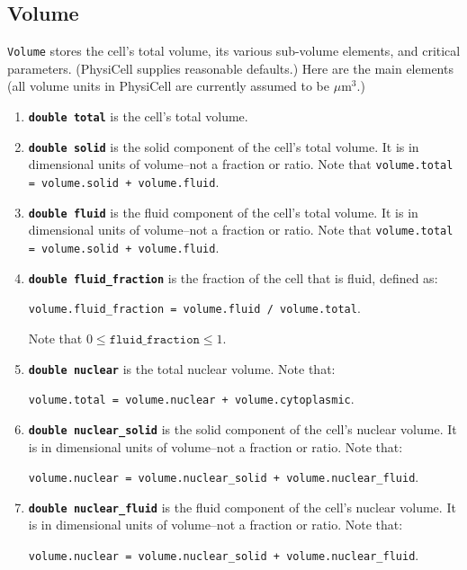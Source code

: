 \documentclass[12pt]{article}
\newcommand{\micron}{\mu\textrm{m}}
\renewcommand{\v}{\verb}
\newcommand{\smallcode}[1]{\textbf{\texttt{#1}}}
\newcommand{\blue}[1]{\textcolor{blue}{#1}}
\newcommand{\DONE}{}%
\begin{document}
\subsection{Volume \DONE}
\label{sec:Volume}
\v|Volume| stores the cell's total volume, its various sub-volume elements, and critical 
parameters. %
(PhysiCell supplies reasonable defaults.) Here are the main elements (all volume units 
in PhysiCell are currently assumed to be $\micron^3$.)  
\begin{enumerate}
\item 
\smallcode{double total} is the cell's total volume. 

\item 
\smallcode{double solid} is the solid component of the cell's total volume. It is in dimensional units 
of volume--not a fraction or ratio. Note that \v|volume.total = volume.solid + volume.fluid|.

\item 
\smallcode{double fluid} is the fluid component of the cell's total volume. It is in dimensional units 
of volume--not a fraction or ratio. Note that \v|volume.total = volume.solid + volume.fluid|.

\item 
\smallcode{double fluid\_fraction} is the fraction of the cell that is fluid, defined as:
 
\verb|volume.fluid_fraction = volume.fluid / volume.total|.  

Note that $0 \le \texttt{fluid\_fraction} \le 1.$

\item 
\smallcode{double nuclear} is the total nuclear volume. Note that: 
 
\v|volume.total = volume.nuclear + volume.cytoplasmic|. 

\item 
\smallcode{double nuclear\_solid} is the solid component of the cell's nuclear volume. It is in dimensional units 
of volume--not a fraction or ratio. Note that:

\v|volume.nuclear = volume.nuclear_solid + volume.nuclear_fluid|.

\item 
\smallcode{double nuclear\_fluid} is the fluid component of the cell's nuclear volume. It is in dimensional units 
of volume--not a fraction or ratio. Note that: 

\v|volume.nuclear = volume.nuclear_solid + volume.nuclear_fluid|.


\end{enumerate}
\end{document}
